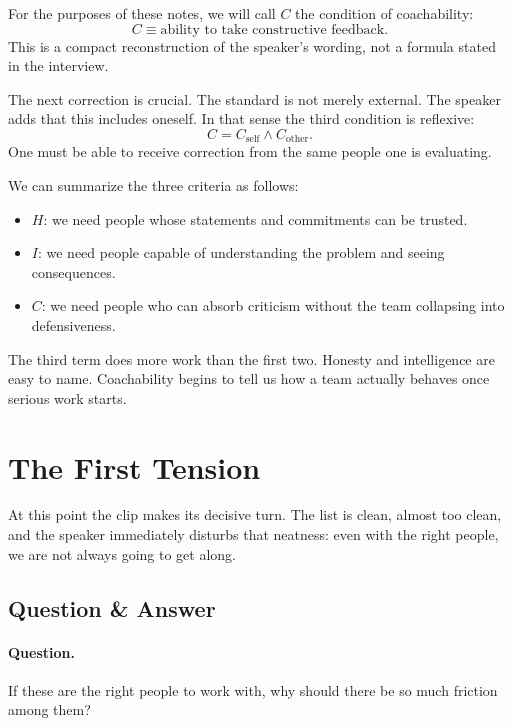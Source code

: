 \begin{definition}
For the purposes of these notes, we will call \(C\) the condition of coachability:
\begin{equation}
C \equiv \text{ability to take constructive feedback}.
\end{equation}
This is a compact reconstruction of the speaker's wording, not a formula stated in the interview.
\end{definition}

The next correction is crucial. The standard is not merely external. The speaker adds that this includes oneself. In that sense the third condition is reflexive:
\begin{equation}
C = C_{\text{self}} \wedge C_{\text{other}}.
\end{equation}
One must be able to receive correction from the same people one is evaluating.

We can summarize the three criteria as follows:
\begin{itemize}
\item \(H\): we need people whose statements and commitments can be trusted.
\item \(I\): we need people capable of understanding the problem and seeing consequences.
\item \(C\): we need people who can absorb criticism without the team collapsing into defensiveness.
\end{itemize}

The third term does more work than the first two. Honesty and intelligence are easy to name. Coachability begins to tell us how a team actually behaves once serious work starts.

\section{The First Tension}

At this point the clip makes its decisive turn. The list is clean, almost too clean, and the speaker immediately disturbs that neatness: even with the right people, we are not always going to get along.

\subsection{Question \& Answer}

\paragraph{Question.} If these are the right people to work with, why should there be so much friction among them?

